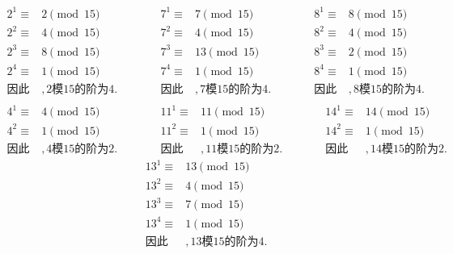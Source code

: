 \documentclass[UTF8]{ctexart}
\begin{document}
\subsection{}   %
\[
    \begin{aligned}
        2^1 \equiv & 2 \pmod {15}\\
        2^2 \equiv & 4 \pmod {15}\\
        2^3 \equiv & 8 \pmod {15}\\
        2^4 \equiv & 1 \pmod {15}\\
        \mbox{因此}&,2\mbox{模}15\mbox{的阶为}4.\\
    \end{aligned}
    \qquad\quad
    \begin{aligned}
        7^1 \equiv & 7  \pmod{15}\\
        7^2 \equiv & 4  \pmod{15}\\
        7^3 \equiv & 13 \pmod{15}\\
        7^4 \equiv & 1  \pmod{15}\\
        \mbox{因此}&,7\mbox{模}15\mbox{的阶为}4.\\
    \end{aligned}
    \qquad\quad
    \begin{aligned}
        8^1 \equiv & 8 \pmod{15}\\
        8^2 \equiv & 4 \pmod{15}\\
        8^3 \equiv & 2 \pmod{15}\\
        8^4 \equiv & 1 \pmod{15}\\
        \mbox{因此}&,8\mbox{模}15\mbox{的阶为}4.\\
    \end{aligned}
\]
\[
    \begin{aligned}
        4^1 \equiv & 4 \pmod{15}\\
        4^2 \equiv & 1 \pmod{15}\\
        \mbox{因此}&,4\mbox{模}15\mbox{的阶为}2.
    \end{aligned}
    \qquad\quad
    \begin{aligned}
        11^1 \equiv & 11 \pmod{15}\\
        11^2 \equiv & 1  \pmod{15}\\
        \mbox{因此}&,11\mbox{模}15\mbox{的阶为}2.
    \end{aligned}
    \qquad\quad
    \begin{aligned}
        14^1 \equiv & 14 \pmod{15}\\
        14^2 \equiv & 1  \pmod{15}\\
        \mbox{因此}&,14\mbox{模}15\mbox{的阶为}2.
    \end{aligned}
\]
\[
    \begin{aligned}
        13^1 \equiv & 13 \pmod{15}\\
        13^2 \equiv & 4  \pmod{15}\\
        13^3 \equiv & 7  \pmod{15}\\
        13^4 \equiv & 1  \pmod{15}\\
        \mbox{因此}&,13\mbox{模}15\mbox{的阶为}4.
    \end{aligned}
\]
\end{document}
